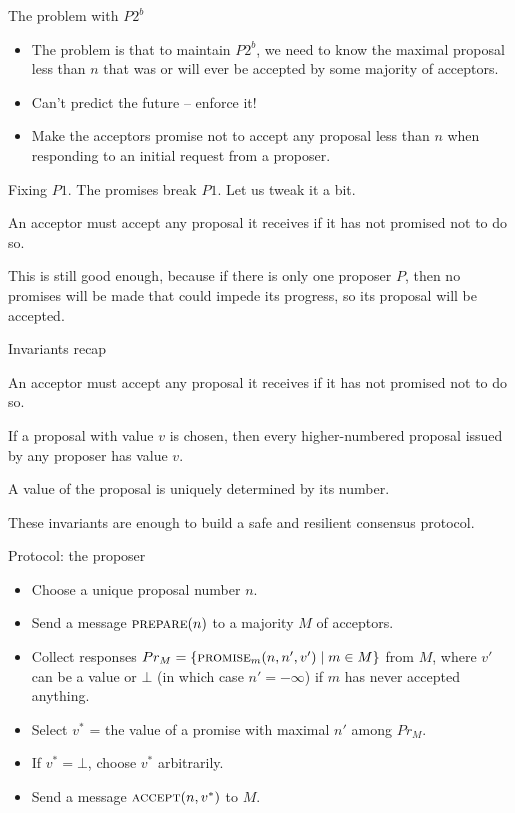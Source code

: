 \documentclass{beamer}
\begin{document}
\begin{frame}{The problem with $P2^b$}
  \begin{itemize}
    \item The problem is that to maintain $P2^b$, we need to know the maximal proposal less than $n$ that was \alert{or will ever be} accepted by some majority of acceptors.
    \item Can't predict the future -- enforce it!
    \item Make the acceptors \alert{promise} not to accept any proposal less than $n$ when responding to an initial request from a proposer.
  \end{itemize}
\end{frame}

\begin{frame}{Fixing $P1$.}
  The promises break $P1$. Let us tweak it a bit.

  \begin{invariant}[$P1^a$]
    An acceptor must accept any proposal it receives if it has not promised not to do so.
  \end{invariant}

  This is still good enough, because if there is only one proposer $P$, then no promises will be made that could impede its progress, so its proposal will be accepted.
\end{frame}

\begin{frame}{Invariants recap}
  \begin{invariant}[$P1^a$]
    An acceptor must accept any proposal it receives if it has not promised not to do so.
  \end{invariant}
  \begin{invariant}[$P2^b$]
    If a proposal with value $v$ is chosen, then every higher-numbered proposal \alert{issued} by any proposer has value $v$.
  \end{invariant}
  \begin{invariant}[P3]
    A value of the proposal is uniquely determined by its number.
  \end{invariant}
  These invariants are enough to build a safe and resilient consensus protocol.
\end{frame}

\begin{frame}{Protocol: the proposer}
  \begin{itemize}
    \item Choose a unique proposal number $n$.
    \item Send a message $\textsc{prepare}(n)$ to a majority $M$ of acceptors.
    \item Collect responses $Pr_M = \{ \textsc{promise}_m(n, n', v') \mid m \in M \}$ from $M$,  where $v'$ can be a value or $\bot$ (in which case $n' = -\infty$) if $m$ has never accepted anything.
    \item Select $v^*$ = the value of a promise with maximal $n'$ among $Pr_M$.
    \item If $v^* = \bot$, choose $v^*$ arbitrarily.
    \item Send a message $\textsc{accept}(n, v^*)$ to $M$.
  \end{itemize}
\end{frame}
\end{document}
